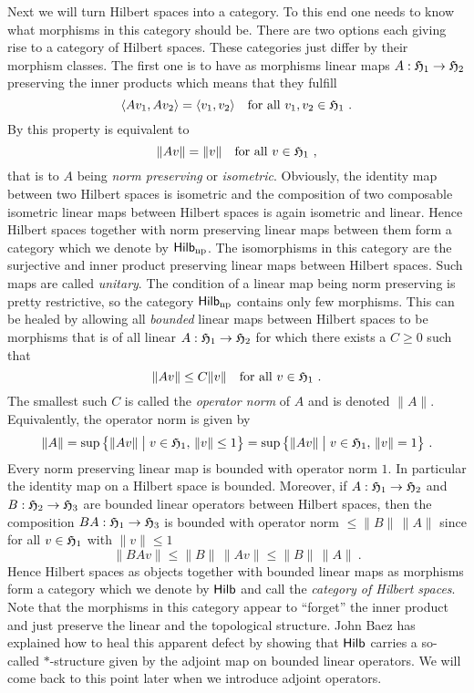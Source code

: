\para
Next we will turn Hilbert spaces into a category. To this end one needs to know what morphisms in this
category should be. There are two options each giving rise to a category of Hilbert spaces. These categories
just differ by their morphism classes. The first one is to
have as morphisms  linear maps $A:\mathfrak{H}_1\to\mathfrak{H}_2$ preserving the inner products which means that
they fulfill
\[
  \langle Av_1,Av_2 \rangle = \langle v_1,v_2 \rangle  \quad \text{for all } v_1,v_2 \in \mathfrak{H}_1 \ .
\] 
By  this property is
equivalent to
\[
  \| Av \| = \| v \| \quad \text{for all } v \in \mathfrak{H}_1 \ ,
\] 
that is to $A$ being \emph{norm preserving} or \emph{isometric}. Obviously, the identity map between two
Hilbert spaces is isometric and the composition of two composable isometric linear maps between Hilbert
spaces is again isometric and linear. Hence Hilbert spaces together with norm preserving linear maps between
them form a  category which we denote by $\mathsf{Hilb_\textup{np}}$. The isomorphisms in this category
are the surjective and inner product preserving linear maps between Hilbert spaces. Such maps
are called \emph{unitary}. The condition of a linear map being norm preserving is pretty restrictive, so
the category $\mathsf{Hilb_\textup{np}}$ contains only few morphisms. This can be healed by allowing all
\emph{bounded} linear maps between Hilbert spaces to be morphisms that is of all
linear $A:\mathfrak{H}_1\to\mathfrak{H}_2$ for which there exists a $C\geq 0$ such that
\[
  \| Av \| \leq C \| v \| \quad \text{for all } v \in \mathfrak{H}_1 \ .
\]
The smallest such $C$ is called the \emph{operator norm} of $A$ and is denoted $\| A\|$.
Equivalently, the operator norm is given by
\[
  \| A\| = \sup \big\{ \| Av \| \bigm\vert v\in \mathfrak{H}_1, \, \| v \| \leq 1 \big\}
  = \sup \big\{ \| Av \| \bigm\vert v\in \mathfrak{H}_1, \, \| v \| = 1 \big\} \ .
\] 
Every norm preserving linear map is bounded with operator norm $1$.
In particular the identity map on a Hilbert space is bounded. Moreover, if
$A: \mathfrak{H}_1\to\mathfrak{H}_2$  and $B: \mathfrak{H}_2\to\mathfrak{H}_3$ are bounded linear operators
between Hilbert spaces, then the composition $BA :  \mathfrak{H}_1\to\mathfrak{H}_3$ is bounded
with operator norm $\leq \| B\|\, \| A\|$ since for all $v \in \mathfrak{H}_1 $ with $\| v\|\leq 1$
\[
  \| BAv \| \leq \| B \| \, \|Av\| \leq \| B\|\, \| A\| \ . 
\]
Hence Hilbert spaces as objects together with bounded linear maps as morphisms form a category which we
denote by $\mathsf{Hilb}$ and call the \emph{category of Hilbert spaces}. Note that the morphisms
in this category appear to ``forget'' the inner product and just preserve the linear and the topological
structure. John Baez \cite[p.~133]{BaeHDAII2HS} has explained how to heal this apparent defect by showing that
$\mathsf{Hilb}$ carries a so-called $*$-structure given by the adjoint map on bounded linear operators.
We will come back to this point later when we introduce adjoint operators. 

